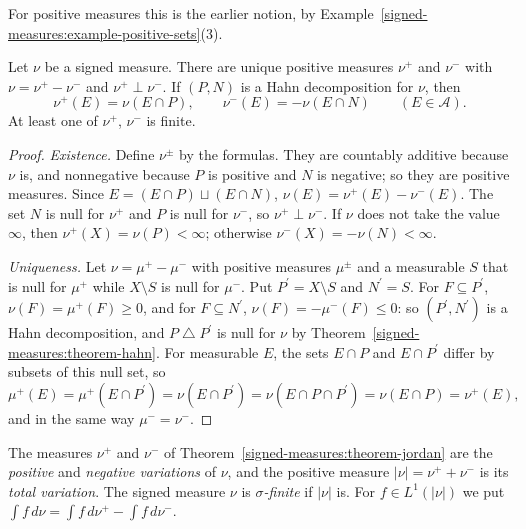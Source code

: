 For positive measures this is the earlier notion, by Example~\ref{signed-measures:example-positive-sets}(3).

\begin{theorem}\label{signed-measures:theorem-jordan}
Let $\nu$ be a signed measure. There are unique positive measures $\nu^+$ and $\nu^-$ with $\nu = \nu^+ - \nu^-$ and $\nu^+ \perp \nu^-$. If $(P, N)$ is a Hahn decomposition for $\nu$, then
\[
\nu^+(E) = \nu(E \cap P), \qquad \nu^-(E) = -\nu(E \cap N) \qquad (E \in \mathcal{A}).
\]
At least one of $\nu^+$, $\nu^-$ is finite.
\end{theorem}

\begin{proof}
\emph{Existence.} Define $\nu^\pm$ by the formulas. They are countably additive because $\nu$ is, and nonnegative because $P$ is positive and $N$ is negative; so they are positive measures. Since
$E = (E \cap P) \sqcup (E \cap N)$, $\nu(E) = \nu^+(E) - \nu^-(E)$. The set $N$ is null for $\nu^+$ and $P$ is null for $\nu^-$, so $\nu^+ \perp \nu^-$. If $\nu$ does not take the value
$\infty$, then $\nu^+(X) = \nu(P) < \infty$; otherwise $\nu^-(X) = -\nu(N) < \infty$.

\emph{Uniqueness.} Let $\nu = \mu^+ - \mu^-$ with positive measures $\mu^\pm$ and a measurable $S$ that is null for $\mu^+$ while $X \setminus S$ is null for $\mu^-$. Put $P^{\prime} = X \setminus S$
and $N^{\prime} = S$. For $F \subseteq P^{\prime}$, $\nu(F) = \mu^+(F) \geq 0$, and for $F \subseteq N^{\prime}$, $\nu(F) = -\mu^-(F) \leq 0$: so $(P^{\prime}, N^{\prime})$ is a Hahn decomposition, and
$P \mathbin{\triangle} P^{\prime}$ is null for $\nu$ by Theorem~\ref{signed-measures:theorem-hahn}. For measurable $E$, the sets $E \cap P$ and $E \cap P^{\prime}$ differ by subsets of this null set, so
\[
\mu^+(E) = \mu^+(E \cap P^{\prime}) = \nu(E \cap P^{\prime}) = \nu(E \cap P \cap P^{\prime}) = \nu(E \cap P) = \nu^+(E),
\]
and in the same way $\mu^- = \nu^-$.
\end{proof}

\begin{definition}\label{signed-measures:definition-variation-signed}
The measures $\nu^+$ and $\nu^-$ of Theorem~\ref{signed-measures:theorem-jordan} are the \emph{positive} and \emph{negative variations} of $\nu$, and the positive measure
$|\nu| = \nu^+ + \nu^-$ is its \emph{total variation}. The signed measure $\nu$ is \emph{$\sigma$-finite} if $|\nu|$ is. For $f \in L^1(|\nu|)$ we put
$\int f\,d\nu = \int f\,d\nu^+ - \int f\,d\nu^-$.
\end{definition}

